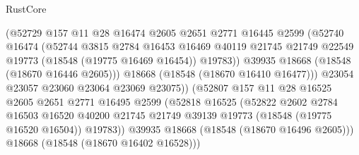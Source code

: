 \begin{lexlean}{RustCore}
\begin{coremodule}
                                (@52729
                                  @157
                                  @11
                                  @28
                                  @16474
                                  @2605
                                  @2651
                                  @2771
                                  @16445
                                  @2599
                                  (@52740
                                    @16474
                                    (@52744
                                      @3815
                                      @2784
                                      @16453
                                      @16469
                                      @40119
                                      @21745
                                      @21749
                                      @22549
                                      @19773
                                      (@18548 (@19775 @16469 @16454))
                                      @19783))
                                  @39935
                                  @18668
                                  (@18548 (@18670 @16446 @2605)))
                                @18668
                                (@18548 (@18670 @16410 @16477)))
                              @23054
                              @23057
                              @23060
                              @23064
                              @23069
                              @23075))
                          (@52807
                            @157
                            @11
                            @28
                            @16525
                            @2605
                            @2651
                            @2771
                            @16495
                            @2599
                            (@52818
                              @16525
                              (@52822
                                @2602
                                @2784
                                @16503
                                @16520
                                @40200
                                @21745
                                @21749
                                @39139
                                @19773
                                (@18548 (@19775 @16520 @16504))
                                @19783))
                            @39935
                            @18668
                            (@18548 (@18670 @16496 @2605)))
                          @18668
                          (@18548 (@18670 @16402 @16528)))

\end{coremodule}
\end{lexlean}
